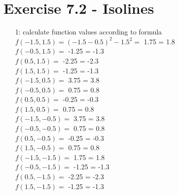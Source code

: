 \documentclass[a4paper]{article}
\begin{document}
\section*{Exercise 7.2 - Isolines}
\begin{enumerate}
	\item[1:] calculate function values according to formula \\
	 
				$f(-1.5, 1.5) = (-1.5 - 0.5)^{2} - 1.5^{2} =$ 1.75 = 1.8\\
				$f(-0.5, 1.5) =$ -1.25 = -1.3\\
				$f(0.5, 1.5) =$ -2.25 = -2.3\\
				$f(1.5, 1.5) =$ -1.25 = -1.3\\
				$f(-1.5, 0.5) =$ 3.75 = 3.8\\
				$f(-0.5, 0.5) =$ 0.75 = 0.8\\
				$f(0.5, 0.5) =$ -0.25 = -0.3\\
				$f(1.5, 0.5) =$ 0.75 = 0.8\\
				$f(-1.5, -0.5) =$ 3.75 = 3.8\\
				$f(-0.5, -0.5) =$ 0.75 = 0.8\\
				$f(0.5, -0.5) =$ -0.25 = -0.3\\
				$f(1.5, -0.5) =$ 0.75 = 0.8 \\
				$f(-1.5, -1.5) =$ 1.75 = 1.8 \\
				$f(-0.5, -1.5) =$ -1.25 = -1.3\\
				$f(0.5, -1.5) =$ -2.25 = -2.3\\
				$f(1.5, -1.5) =$ -1.25 = -1.3\\
				

\end{enumerate}
\end{document}
